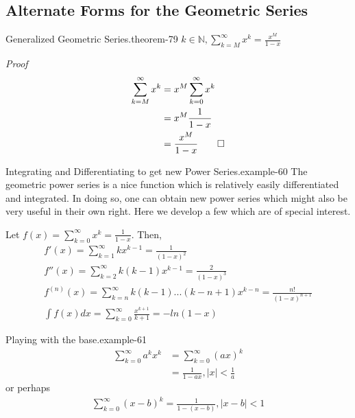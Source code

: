 \documentclass[10pt,]{book}
\makeatletter
\renewcommand*{\proofname}{Proof}
\renewenvironment{proof}[1][\proofname]{\par
  \pushQED{\qed}%
  \normalfont \topsep6\p@\@plus6\p@\relax
  \trivlist
  \item\relax
    {\itshape
    #1\@addpunct{.}}\hspace\labelsep\ignorespaces
}{%
  \popQED\endtrivlist\@endpefalse
}
\numberwithin{equation}{section}
\newcommand{\lt}{<}
\makeatother
\begin{document}
\subsection[{Alternate Forms for the Geometric Series}]{Alternate Forms for the Geometric Series}\label{subsection-8}
\begin{theorem}{Generalized Geometric Series.}{}{theorem-79}%
\(k \in \mathbb{N}, \sum_{k=M}^{\infty} {x^k} = \frac{x^M}{1-x}\)\end{theorem}
\begin{proof}\hypertarget{proof-76}{}
%
\begin{align*}
\sum_{k=M}^{\infty} {x^k} & = x^M \sum_{k=0}^{\infty} {x^k}\\
& = x^M \frac{1}{1-x}\\
& = \frac{x^M}{1-x}\qedhere
\end{align*}
\end{proof}
\begin{example}{Integrating and Differentiating to get new Power Series.}{example-60}%
\hypertarget{p-1443}{}%
The geometric power series is a nice function which is relatively easily differentiated and integrated. In doing so, one can obtain new power series which might also be very useful in their own right.  Here we develop a few which are of special interest.%
\par
\hypertarget{p-1444}{}%
Let \(f(x) = \sum_{k=0}^\infty x^k = \frac{1}{1-x}\).  Then,%
%
\begin{gather*}
f'(x) = \sum_{k=1}^{\infty} {kx^{k-1}} = \frac{1}{(1-x)^2}\\
f''(x) = \sum_{k=2}^{\infty} {k(k-1)x^{k-1}} = \frac{2}{(1-x)^3}\\
f^{(n)}(x) = \sum_{k=n}^{\infty} {k(k-1)...(k-n+1)x^{k-n}} = \frac{n!}{(1-x)^{n+1}}\\
\int f(x) dx = \sum_{k=0}^{\infty} {\frac{x^{k+1}}{k+1}} = -ln(1-x)
\end{gather*}
\end{example}
\begin{example}{Playing with the base.}{example-61}%
%
\begin{align*}
\sum_{k=0}^{\infty} {a^k x^k} & = \sum_{k=0}^{\infty} {(ax)^k}\\
& = \frac{1}{1-ax}, |x| \lt \frac{1}{a}
\end{align*}
\hypertarget{p-1445}{}%
or perhaps%
%
\begin{gather*}
\sum_{k=0}^{\infty} {(x-b)^k} = \frac{1}{1-(x-b)}, |x-b| \lt 1
\end{gather*}
\end{example}
\end{document}
